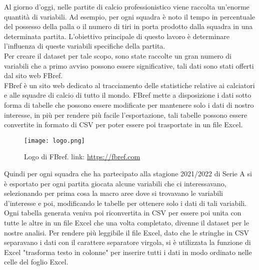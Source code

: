 Al giorno d'oggi, nelle partite di calcio professionistico viene raccolta un'enorme quantità di variabili. Ad esempio, per ogni squadra è noto il tempo in percentuale del possesso della palla o il numero di tiri in porta prodotto dalla squadra in una determinata partita. L'obiettivo principale di questo lavoro è determinare l'influenza di queste variabili specifiche della partita. \\
Per creare il dataset per tale scopo, sono state raccolte un gran numero di variabili che a primo avviso possono essere significative, tali dati sono stati offerti dal sito web FBref.\\
FBref è un sito web dedicato al tracciamento delle statistiche relative ai calciatori e alle squadre di calcio di tutto il mondo. FBref mette a disposizione i dati sotto forma di tabelle che possono essere modificate per mantenere solo i dati di nostro interesse, in più per rendere più facile l'esportazione, tali tabelle possono essere convertite in formato di CSV per poter essere poi trasportate in un file Excel.\\
\begin{figure}[!htb]
	\begin{center}
		\texttt{[image: logo.png]}
		\caption{Logo di FBref. link: \url{https://fbref.com}} \label{fig:filt}
	\end{center}
\end{figure}



Quindi per ogni squadra che ha partecipato alla stagione 2021/2022 di Serie A si è esportato per ogni partita giocata alcune variabili che ci interessavano, selezionando per prima cosa la macro aree dove si trovavano le variabili d'interesse e poi, modificando le tabelle per ottenere solo i dati di tali variabili. Ogni tabella generata veniva poi riconvertita in CSV per essere poi unita con tutte le altre in un file Excel che una volta completato, divenne il dataset per le nostre analisi. Per rendere più leggibile il file Excel, dato che le stringhe in CSV separavano i dati con il carattere separatore virgola, si è utilizzata la funzione di Excel "trasforma testo in colonne" per inserire tutti i dati in modo ordinato nelle celle del foglio Excel.

